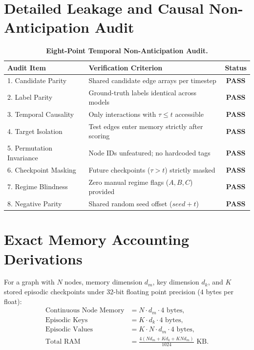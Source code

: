 \section{Detailed Leakage and Causal Non-Anticipation Audit}
\label{app:leakage}

\begin{table}[h]
\centering
\small
\caption{\textbf{Eight-Point Temporal Non-Anticipation Audit.}}
\label{tab:app_leakage}
\begin{tabular}{llc}
\toprule
\textbf{Audit Item} & \textbf{Verification Criterion} & \textbf{Status} \\
\midrule
1. Candidate Parity & Shared candidate edge arrays per timestep & \textbf{PASS} \\
2. Label Parity & Ground-truth labels identical across models & \textbf{PASS} \\
3. Temporal Causality & Only interactions with $\tau \le t$ accessible & \textbf{PASS} \\
4. Target Isolation & Test edges enter memory strictly after scoring & \textbf{PASS} \\
5. Permutation Invariance & Node IDs unfeatured; no hardcoded tags & \textbf{PASS} \\
6. Checkpoint Masking & Future checkpoints ($\tau > t$) strictly masked & \textbf{PASS} \\
7. Regime Blindness & Zero manual regime flags ($A, B, C$) provided & \textbf{PASS} \\
8. Negative Parity & Shared random seed offset ($seed + t$) & \textbf{PASS} \\
\bottomrule
\end{tabular}
\end{table}

\section{Exact Memory Accounting Derivations}
\label{app:memory_accounting}

For a graph with $N$ nodes, memory dimension $d_m$, key dimension $d_k$, and $K$ stored episodic checkpoints under 32-bit floating point precision ($4$ bytes per float):
\begin{align}
    \text{Continuous Node Memory} &= N \cdot d_m \cdot 4 \text{ bytes}, \\
    \text{Episodic Keys} &= K \cdot d_k \cdot 4 \text{ bytes}, \\
    \text{Episodic Values} &= K \cdot N \cdot d_m \cdot 4 \text{ bytes}, \\
    \text{Total RAM} &= \frac{4 (N d_m + K d_k + K N d_m)}{1024} \text{ KB}.
\end{align}

